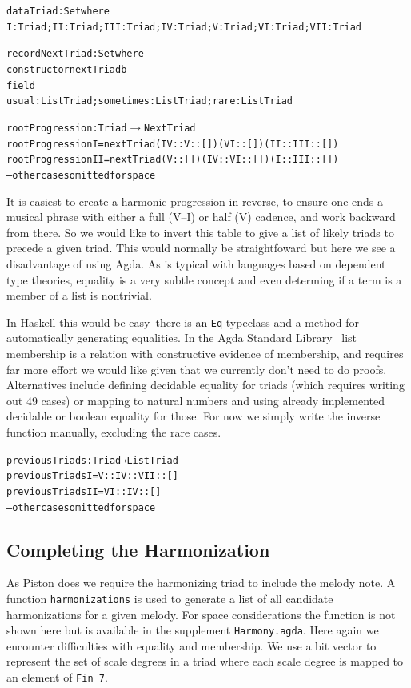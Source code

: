 \begin{alltt}
data Triad : Set where
  I : Triad; II : Triad; III : Triad; IV : Triad; V : Triad; VI : Triad; VII : Triad

record NextTriad : Set where
  constructor nextTriadb
  field
    usual : List Triad; sometimes : List Triad; rare : List Triad

rootProgression : Triad \(\rightarrow\) NextTriad
rootProgression I   = nextTriad (IV :: V :: []) (VI :: []) (II :: III :: [])
rootProgression II  = nextTriad (V :: []) (IV  :: VI :: []) (I :: III :: [])
-- other cases omitted for space
\end{alltt}

It is easiest to create a harmonic progression in reverse, to
ensure one ends a musical phrase with either a full (V--I) or half (V)
cadence, and work backward from there. So we would like to invert this
table to give a list of likely triads to precede a given triad. This
would normally be straightfoward but here we see a disadvantage of
using Agda. As is typical with languages based on dependent type
theories, equality is a very subtle concept and even determing if a
term is a member of a list is nontrivial.

In Haskell this would be easy--there is an \texttt{Eq} typeclass and a
method for automatically generating equalities. In the Agda Standard
Library~\citep{agda-stdlib} list membership is a relation with
constructive evidence of membership, and requires far more effort we
would like given that we currently don't need to do
proofs. Alternatives include defining decidable equality for triads
(which requires writing out 49 cases) or mapping to natural numbers
and using already implemented decidable or boolean equality for
those. For now we simply write the inverse function manually,
excluding the rare cases.

\begin{alltt}
previousTriads : Triad → List Triad
previousTriads I   = V :: IV :: VII :: []
previousTriads II  = VI :: IV :: []
-- other cases omitted for space
\end{alltt}

\subsection{Completing the Harmonization}
\label{sec:harmony:complete}

As Piston does we require the harmonizing triad to include the melody
note. A function \texttt{harmonizations} is used to generate a list of
all candidate harmonizations for a given melody. For space
considerations the function is not shown here but is available in the
supplement \texttt{Harmony.agda}. Here again we encounter difficulties
with equality and membership. We use a bit vector to represent the
set of scale degrees in a triad where each scale degree is mapped to
an element of \texttt{Fin 7}.

